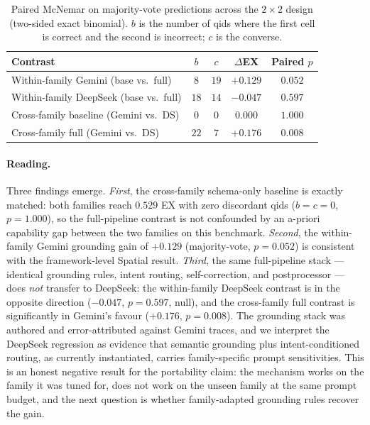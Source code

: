 \documentclass[11pt]{article}
\begin{document}
\begin{table}[h]
\centering
\caption{Paired McNemar on majority-vote predictions across the $2{\times}2$
design (two-sided exact binomial). $b$ is the number of qids where the first
cell is correct and the second is incorrect; $c$ is the converse.}
\label{tab:cross-family-paired}
\begin{tabular}{lcccc}
\toprule
Contrast & $b$ & $c$ & $\Delta$EX & Paired $p$ \\
\midrule
Within-family Gemini   (base vs.\ full)     & $8$  & $19$ & $+0.129$ & $0.052$ \\
Within-family DeepSeek (base vs.\ full)     & $18$ & $14$ & $-0.047$ & $0.597$ \\
Cross-family baseline  (Gemini vs.\ DS)     & $0$  & $0$  & $0.000$  & $1.000$ \\
Cross-family full      (Gemini vs.\ DS)     & $22$ & $7$  & $+0.176$ & $0.008$ \\
\bottomrule
\end{tabular}
\end{table}

\paragraph{Reading.} Three findings emerge. \emph{First}, the cross-family
schema-only baseline is exactly matched: both families reach $0.529$ EX with
zero discordant qids ($b=c=0$, $p=1.000$), so the full-pipeline contrast is
not confounded by an a-priori capability gap between the two families on this
benchmark. \emph{Second}, the within-family Gemini grounding gain of $+0.129$
(majority-vote, $p=0.052$) is consistent with the framework-level Spatial result.
\emph{Third}, the same full-pipeline stack --- identical grounding rules,
intent routing, self-correction, and postprocessor --- does \emph{not}
transfer to DeepSeek: the within-family DeepSeek contrast is in the opposite
direction ($-0.047$, $p=0.597$, null), and the cross-family full contrast is
significantly in Gemini's favour ($+0.176$, $p=0.008$). The grounding stack
was authored and error-attributed against Gemini traces, and we interpret the
DeepSeek regression as evidence that semantic grounding plus intent-conditioned
routing, as currently instantiated, carries family-specific prompt
sensitivities. This is an honest negative result for the portability claim:
the mechanism works on the family it was tuned for, does not work on the
unseen family at the same prompt budget, and the next question is whether
family-adapted grounding rules recover the gain.
\end{document}
